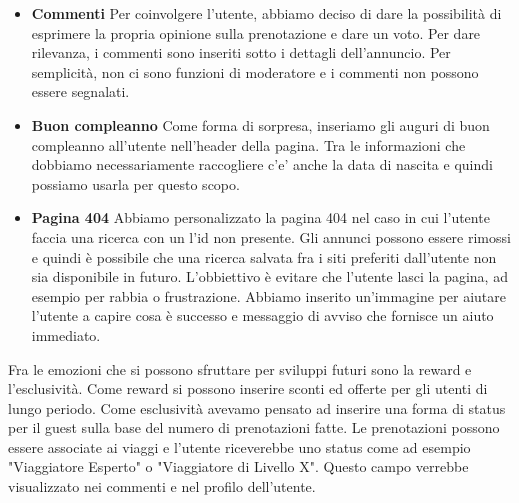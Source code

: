 \documentclass[1_relazione.tex]{subfiles}
\begin{document}
    \begin{itemize}
        \item \textbf{Commenti} Per coinvolgere l'utente, abbiamo deciso di dare la possibilit\`{a} di esprimere la propria opinione sulla prenotazione e dare un voto. Per dare rilevanza, i commenti sono inseriti sotto i dettagli dell'annuncio. Per semplicit\`{a}, non ci sono funzioni di moderatore e i commenti non possono essere segnalati.

        \item \textbf{Buon compleanno} Come forma di sorpresa, inseriamo gli auguri di buon compleanno all'utente nell'header della pagina. Tra le informazioni che dobbiamo necessariamente raccogliere c'e' anche la data di nascita e quindi possiamo usarla per questo scopo.

        \item \textbf{Pagina 404} Abbiamo personalizzato la pagina 404 nel caso in cui l'utente faccia una ricerca con un l'id non presente. Gli annunci possono essere rimossi e quindi è possibile che una ricerca salvata fra i siti preferiti dall'utente non sia disponibile in futuro. L'obbiettivo è evitare che l'utente lasci la pagina, ad esempio per rabbia o frustrazione. Abbiamo inserito un'immagine per aiutare l'utente a capire cosa è successo e messaggio di avviso che fornisce un aiuto immediato.

    \end{itemize}

    Fra le emozioni che si possono sfruttare per sviluppi futuri sono la reward e l'esclusivit\`{a}. Come reward si possono inserire sconti ed offerte per gli utenti di lungo periodo. Come esclusivit\`{a} avevamo pensato ad inserire una forma di status per il guest sulla base del numero di prenotazioni fatte. Le prenotazioni possono essere associate ai viaggi e l'utente riceverebbe uno status come ad esempio "Viaggiatore Esperto" o "Viaggiatore di Livello X". Questo campo verrebbe visualizzato nei commenti e nel profilo dell'utente.
\end{document}
